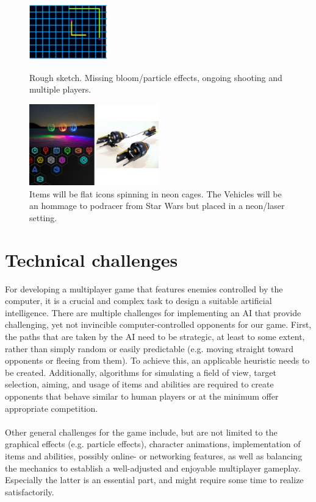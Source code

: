 \documentclass[10pt,a4paper]{article}
\begin{document}
\begin{figure}[H]
  \centering
  \includegraphics[width=0.3\textwidth]{sketch.png}
  \label{fig:figure3}
  \caption{Rough sketch. Missing bloom/particle effects, ongoing shooting and multiple players.}
\end{figure}

\begin{figure}[H]
  \centering
  \includegraphics[width=0.5\textwidth]{itemslook.png}
  \caption{Items will be flat icons spinning in neon cages. The Vehicles will be an hommage to podracer from Star Wars but placed in a neon/laser setting.}
  \label{fig:figure4}
\end{figure}

\section{Technical challenges}

For developing a multiplayer game that features enemies controlled by
the computer, it is a crucial and complex task to design a suitable
artificial intelligence. There are multiple challenges for implementing
an AI that provide challenging, yet not invincible computer-controlled
opponents for our game. First, the paths that are taken by the AI need
to be strategic, at least to some extent, rather than simply random or
easily predictable (e.g. moving straight toward opponents or fleeing
from them). To achieve this, an applicable heuristic needs to be
created. Additionally, algorithms for simulating a field of view, target
selection, aiming, and usage of items and abilities are required to
create opponents that behave similar to human players or at the minimum
offer appropriate competition.\\
\\
Other general challenges for the game include, but are not limited to
the graphical effects (e.g. particle effects), character animations,
implementation of items and abilities, possibly online- or networking
features, as well as balancing the mechanics to establish a
well-adjusted and enjoyable multiplayer gameplay. Especially the latter
is an essential part, and might require some time to realize satisfactorily.
\end{document}
